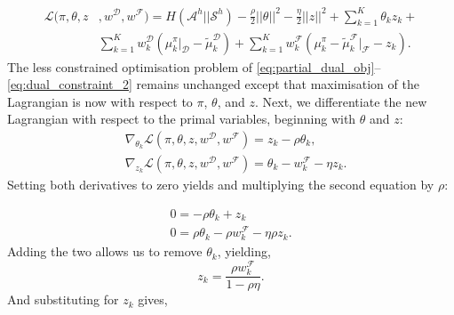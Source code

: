 \documentclass{aamas2016}
\newcommand{\sw}[1]{\textcolor{red}{SW: #1}}
\newcommand{\jm}[1]{\textcolor{blue}{Joao: #1}}
\newcommand{\ks}[1]{\textcolor{dark_green}{Kyriacos: #1}}
\newcommand{\sw}[1]{}
\newcommand{\jm}[1]{}
\newcommand{\ks}[1]{}
\begin{document}
\begin{equation}
\begin{split}
\label{eq:partial_lagrangian_failure}
\mathcal{L}(\pi,\theta,z &,w^{\mathcal{D}},w^{\mathcal{F}})=  H(\mathcal{A}^h||\mathcal{S}^h) - \frac{\rho}{2}||\theta||^2 - \frac{\eta}{2}||z||^2 + \sum_{k=1}^K\theta_kz_k+\\
&
\sum_{k=1}^Kw^{\mathcal{D}}_k(\mu^{\pi}_k|_{\mathcal{D}}-\widetilde{\mu}^{\mathcal{D}}_k) + 
\sum_{k=1}^Kw^{\mathcal{F}}_k (\mu^{\pi}_k -\widetilde{\mu}^{\mathcal{F}}_k|_{\mathcal{F}} - z_k).
\end{split}
\end{equation}
The less constrained optimisation problem of \eqref{eq:partial_dual_obj}--\eqref{eq:dual_constraint_2} remains unchanged except that maximisation of the Lagrangian is now with respect to $\pi$, $\theta$, and $z$.
Next, we differentiate the new Lagrangian with respect to the primal variables, beginning with $\theta$ and $z$:
\begin{align}
	&\nabla_{\theta_k}\mathcal{L}(\pi,\theta,z,w^{\mathcal{D}},w^{\mathcal{F}}) = z_k - \rho\theta_k,\\
	&\nabla_{z_k}\mathcal{L}(\pi,\theta,z,w^{\mathcal{D}},w^{\mathcal{F}}) = \theta_k - w^{\mathcal{F}}_k - \eta z_k.
\end{align}
Setting both derivatives to zero yields and multiplying the second equation by $\rho$:

\begin{align}
	0 = - \rho\theta_k + z_k \\
	0= \rho\theta_k - \rho w^{\mathcal{F}}_k - \eta \rho z_k.
\end{align}
Adding the two allows us to remove $\theta_k$, yielding,
\begin{equation}
	 z_k= \frac{\rho w^{\mathcal{F}}_k}{1- \rho \eta} .
\end{equation}
And substituting for $z_k$ gives,
\end{document}
